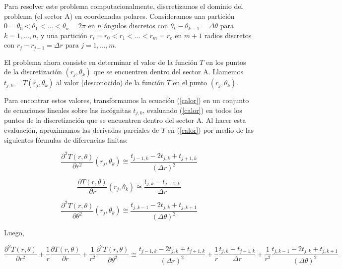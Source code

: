 \medskip

Para resolver este problema computacionalmente, discretizamos el dominio del problema (el sector A) en coordenadas polares. Consideramos una partici\'on $0 = \theta_0 < \theta_1 < ... < \theta_n = 2\pi$ en $n$ \'angulos discretos con $\theta_k-\theta_{k-1} = \Delta\theta$ para $k = 1,...,n$, y una partici\'on $r_i = r_0 < r_1 < ... < r_m = r_e$ en $m+1$ radios discretos con $r_j - r_{j-1} = \Delta r$ para $j = 1,...,m$.

\medskip

El problema ahora consiste en determinar el valor de la funci\'on $T$ en los puntos de la discretizaci\'on $(r_j,\theta_k)$ que se encuentren dentro del sector A. Llamemos $t_{j,k} = T(r_j,\theta_k)$ al valor (desconocido) de la funci\'on $T$ en el punto $(r_j,\theta_k)$.

\medskip

Para encontrar estos valores, transformamos la ecuaci\'on (\ref{calor}) en un conjunto de ecuaciones lineales sobre las inc\'ognitas $t_{j,k}$, evaluando (\ref{calor}) en todos los puntos de la discretizaci\'on que se encuentren dentro del sector A. Al hacer esta evaluaci\'on, aproximamos las derivadas parciales de $T$ en (\ref{calor}) por medio de las siguientes f\'ormulas de diferencias finitas:


\begin{equation}
\frac{\partial^2T(r,\theta)}{\partial r^2}(r_j,\theta_k) \cong \frac{t_{j-1,k}-2t_{j,k}+t_{j+1,k}}{(\Delta r)^2}
\end{equation}

\begin{equation}
\frac{\partial T(r,\theta)}{\partial r}(r_j,\theta_k) \cong \frac{t_{j,k}-t_{j-1,k}}{\Delta r}
\end{equation}

\begin{equation}
\frac{\partial^2T(r,\theta)}{\partial \theta^2}(r_j,\theta_k) \cong \frac{t_{j,k-1}-2t_{j,k}+t_{j,k+1}}{(\Delta \theta)^2}
\end{equation}

Luego,

\begin{equation}\label{calor_discretizada}
\frac{\partial^2T(r,\theta)}{\partial r^2}+\frac{1}{r}\frac{\partial T(r,\theta)}{\partial r}+\frac{1}{r^2}\frac{\partial^2T(r,\theta)}{\partial \theta^2} \cong \frac{t_{j-1,k}-2t_{j,k}+t_{j+1,k}}{(\Delta r)^2} + \frac{1}{r}\frac{t_{j,k}-t_{j-1,k}}{\Delta r} + \frac{1}{r^2}\frac{t_{j,k-1}-2t_{j,k}+t_{j,k+1}}{(\Delta \theta)^2}
\end{equation}

